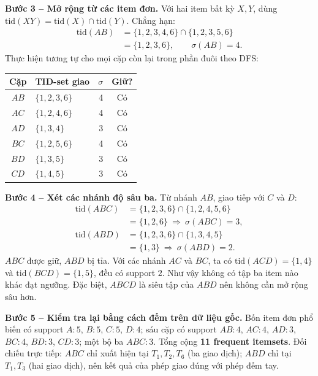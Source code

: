 \noindent\textbf{Bước 3 -- Mở rộng từ các item đơn.} Với hai item bất kỳ $X,Y$, dùng $\mathrm{tid}(XY)=\mathrm{tid}(X)\cap\mathrm{tid}(Y)$. Chẳng hạn:
\begin{equation*}
\begin{aligned}
\mathrm{tid}(AB)&=\{1,2,3,4,6\}\cap\{1,2,3,5,6\}\\
                &=\{1,2,3,6\},\qquad \sigma(AB)=4.
\end{aligned}
\end{equation*}
Thực hiện tương tự cho mọi cặp còn lại trong phần đuôi theo DFS:
\begin{center}
\footnotesize
\setlength{\tabcolsep}{4pt}
\begin{tabular}{@{}clrc@{}}\toprule
Cặp & TID-set giao & $\sigma$ & Giữ?\\\midrule
$AB$ & $\{1,2,3,6\}$ & 4 & Có\\
$AC$ & $\{1,2,4,6\}$ & 4 & Có\\
$AD$ & $\{1,3,4\}$   & 3 & Có\\
$BC$ & $\{1,2,5,6\}$ & 4 & Có\\
$BD$ & $\{1,3,5\}$   & 3 & Có\\
$CD$ & $\{1,4,5\}$   & 3 & Có\\\bottomrule
\end{tabular}
\end{center}
\noindent\textbf{Bước 4 -- Xét các nhánh độ sâu ba.} Từ nhánh $AB$, giao tiếp với $C$ và $D$:
\begin{equation*}
\begin{aligned}
\mathrm{tid}(ABC)&=\{1,2,3,6\}\cap\{1,2,4,5,6\}\\
                 &=\{1,2,6\}\ \Rightarrow\ \sigma(ABC)=3,\\
\mathrm{tid}(ABD)&=\{1,2,3,6\}\cap\{1,3,4,5\}\\
                 &=\{1,3\}\ \Rightarrow\ \sigma(ABD)=2.
\end{aligned}
\end{equation*}
$ABC$ được giữ, $ABD$ bị tỉa. Với các nhánh $AC$ và $BC$, ta có $\mathrm{tid}(ACD)=\{1,4\}$ và $\mathrm{tid}(BCD)=\{1,5\}$, đều có support $2$. Như vậy không có tập ba item nào khác đạt ngưỡng. Đặc biệt, $ABCD$ là siêu tập của $ABD$ nên không cần mở rộng sâu hơn.

\noindent\textbf{Bước 5 -- Kiểm tra lại bằng cách đếm trên dữ liệu gốc.} Bốn item đơn phổ biến có support $A:5$, $B:5$, $C:5$, $D:4$; sáu cặp có support $AB:4$, $AC:4$, $AD:3$, $BC:4$, $BD:3$, $CD:3$; một bộ ba $ABC:3$. Tổng cộng \textbf{11 frequent itemsets}. Đối chiếu trực tiếp: $ABC$ chỉ xuất hiện tại $T_1,T_2,T_6$ (ba giao dịch); $ABD$ chỉ tại $T_1,T_3$ (hai giao dịch), nên kết quả của phép giao đúng với phép đếm tay.

